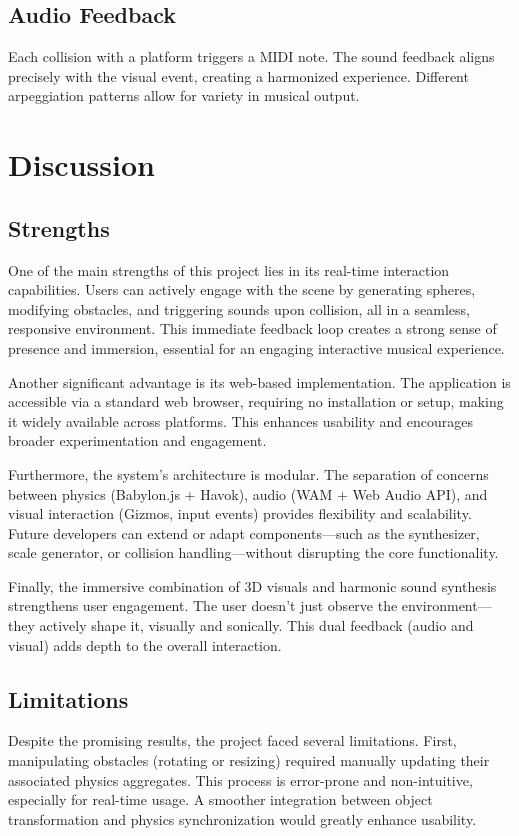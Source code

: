 \documentclass[a4paper,11pt]{article}
\begin{document}
\subsection{Audio Feedback}
Each collision with a platform triggers a MIDI note. The sound feedback aligns precisely with the visual event, creating a harmonized experience. Different arpeggiation patterns allow for variety in musical output.
\newpage
\section{Discussion}

\subsection{Strengths}
One of the main strengths of this project lies in its real-time interaction capabilities. Users can actively engage with the scene by generating spheres, modifying obstacles, and triggering sounds upon collision, all in a seamless, responsive environment. This immediate feedback loop creates a strong sense of presence and immersion, essential for an engaging interactive musical experience.

Another significant advantage is its web-based implementation. The application is accessible via a standard web browser, requiring no installation or setup, making it widely available across platforms. This enhances usability and encourages broader experimentation and engagement.

Furthermore, the system's architecture is modular. The separation of concerns between physics (Babylon.js + Havok), audio (WAM + Web Audio API), and visual interaction (Gizmos, input events) provides flexibility and scalability. Future developers can extend or adapt components—such as the synthesizer, scale generator, or collision handling—without disrupting the core functionality.

Finally, the immersive combination of 3D visuals and harmonic sound synthesis strengthens user engagement. The user doesn't just observe the environment—they actively shape it, visually and sonically. This dual feedback (audio and visual) adds depth to the overall interaction.

\subsection{Limitations}
Despite the promising results, the project faced several limitations. First, manipulating obstacles (rotating or resizing) required manually updating their associated physics aggregates. This process is error-prone and non-intuitive, especially for real-time usage. A smoother integration between object transformation and physics synchronization would greatly enhance usability.
\end{document}
